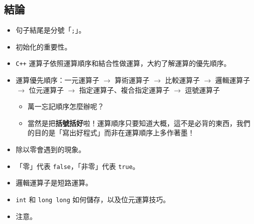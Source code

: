 \documentclass[12pt,a4paper,oneside]{report}
\begin{document}
\begin{CJK}{UTF8}{bkai}
\section{結論}

\begin{itemize}
\item 句子結尾是分號「\lstinline!;!」。
\item 初始化的重要性。
\item \texttt{C++} 運算子依照運算順序和結合性做運算，大約了解運算的優先順序。
\item 運算優先順序：一元運算子 $\rightarrow$ 算術運算子 $\rightarrow$ 比較運算子 $\rightarrow$ 邏輯運算子 $\rightarrow$ 位元運算子 $\rightarrow$ 指定運算子、複合指定運算子 $\rightarrow$ 逗號運算子
  \begin{itemize}
  \item 萬一忘記順序怎麼辦呢？
  \item 當然是把\textbf{括號括好}啦！運算順序只要知道大概，這不是必背的東西，我們的目的是「寫出好程式」而非在運算順序上多作著墨！
  \end{itemize}
\item 除以零會遇到的現象。
\item 「零」代表 \lstinline!false!，「非零」代表 \lstinline!true!。
\item 邏輯運算子是短路運算。
\item \lstinline!int! 和 \lstinline!long long! 如何儲存，以及位元運算技巧。
\item 注意。
\end{itemize}

\ifx \allfiles \undefined

\printindex

\clearpage
\end{CJK}
\end{document}
